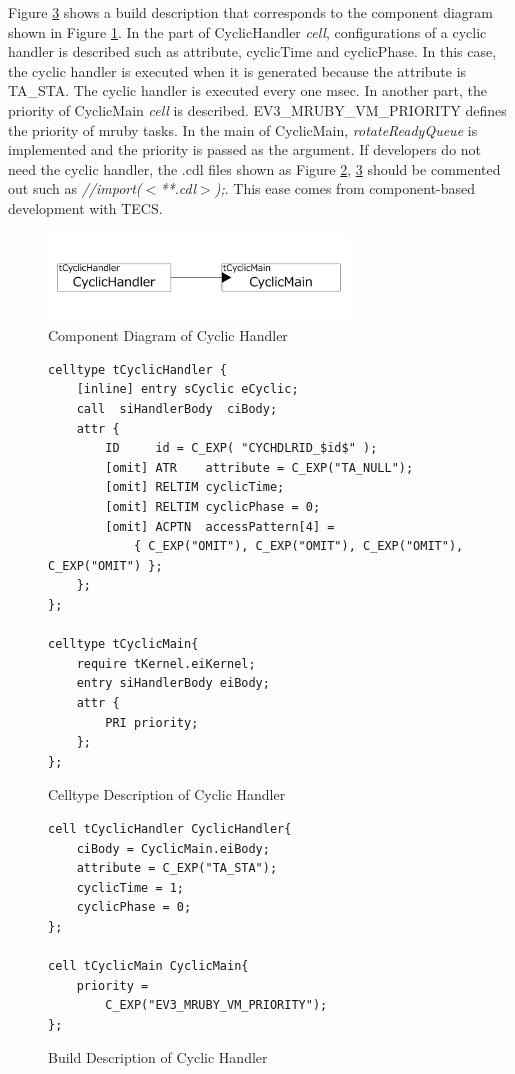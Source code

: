 \documentclass[conference,compsoc]{IEEEtran}
\begin{document}
Figure \ref{build_cyclic_handler} shows a build description that corresponds to the component diagram shown in Figure \ref{fig:cyclic_handler}.
In the part of CyclicHandler {\it cell}, configurations of a cyclic handler is described such as attribute, cyclicTime and cyclicPhase.
In this case, the cyclic handler is executed when it is generated because the attribute is TA\_STA.
The cyclic handler is executed every one msec.
In another part, the priority of CyclicMain {\it cell} is described.
EV3\_MRUBY\_VM\_PRIORITY defines the priority of mruby tasks.
In the main of CyclicMain, {\it rotateReadyQueue} is implemented and the priority is passed as the argument.
If developers do not need the cyclic handler, the .cdl files shown as Figure \ref{celltype_cyclic_handler}, \ref{build_cyclic_handler} should be commented out such as {\it //import($<$**.cdl$>$);}.
This ease comes from component-based development with TECS.

\begin{figure}[t]
    \centering
    \includegraphics[width=8cm,clip]{figure/cyclic_handler.pdf}
    \caption{Component Diagram of Cyclic Handler}
    \label{fig:cyclic_handler}
\end{figure}
\begin{figure}[t]
    \centering
    \begin{lstlisting}
celltype tCyclicHandler {
    [inline] entry sCyclic eCyclic;
    call  siHandlerBody  ciBody;
    attr {
    	ID     id = C_EXP( "CYCHDLRID_$id$" );
    	[omit] ATR    attribute = C_EXP("TA_NULL");
    	[omit] RELTIM cyclicTime;
    	[omit] RELTIM cyclicPhase = 0;
        [omit] ACPTN  accessPattern[4] =
            { C_EXP("OMIT"), C_EXP("OMIT"), C_EXP("OMIT"), C_EXP("OMIT") };
    };
};

celltype tCyclicMain{
    require tKernel.eiKernel;
    entry siHandlerBody eiBody;
    attr {
        PRI priority;
    };
};
    \end{lstlisting}
    \caption{Celltype Description of Cyclic Handler}
    \label{celltype_cyclic_handler}
\end{figure}
\begin{figure}[t]
    \centering
    \begin{lstlisting}
cell tCyclicHandler CyclicHandler{
    ciBody = CyclicMain.eiBody;
    attribute = C_EXP("TA_STA");
    cyclicTime = 1;
    cyclicPhase = 0;
};

cell tCyclicMain CyclicMain{
    priority =
        C_EXP("EV3_MRUBY_VM_PRIORITY");
};
   \end{lstlisting}
    \caption{Build Description of Cyclic Handler}
    \label{build_cyclic_handler}
\end{figure}
\end{document}

